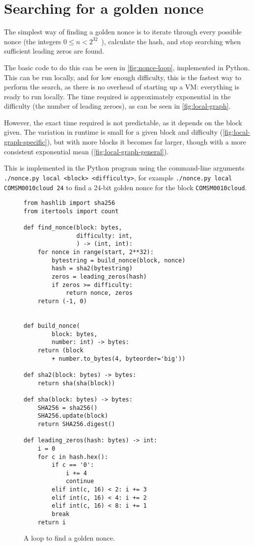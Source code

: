 \documentclass[letterpaper,twocolumn,11pt]{article}
\begin{document}
\section{Searching for a golden nonce}

The simplest way of finding a golden nonce is to iterate through every possible nonce (the integers $0\leq n< 2^{32}$~\cite{cw1}), calculate the hash, and stop searching when sufficient leading zeros are found.

The basic code to do this can be seen in \autoref{fig:nonce-loop}, implemented in Python. This can be run locally, and for low enough difficulty, this is the fastest way to perform the search, as there is no overhead of starting up a VM: everything is ready to run locally. The time required is approximately exponential in the difficulty (the number of leading zeroes), as can be seen in \autoref{fig:local-graph}.

However, the exact time required is not predictable, as it depends on the block given. The variation in runtime is small for a given block and difficulty (\autoref{fig:local-graph-specific}), but with more blocks it becomes far larger, though with a more consistent exponential mean (\autoref{fig:local-graph-general}).

This is implemented in the Python program using the command-line arguments \texttt{./nonce.py local <block> <difficulty>}, for example \verb|./nonce.py local COMSM0010cloud 24| to find a 24-bit golden nonce for the block \texttt{COMSM0010cloud}.

\begin{figure}
\begin{verbatim}
from hashlib import sha256
from itertools import count

def find_nonce(block: bytes,
               difficulty: int,
               ) -> (int, int):
    for nonce in range(start, 2**32):
        bytestring = build_nonce(block, nonce)
        hash = sha2(bytestring)
        zeros = leading_zeros(hash)
        if zeros >= difficulty:
            return nonce, zeros
    return (-1, 0)


def build_nonce(
        block: bytes,
        number: int) -> bytes:
    return (block
        + number.to_bytes(4, byteorder='big'))

def sha2(block: bytes) -> bytes:
    return sha(sha(block))

def sha(block: bytes) -> bytes:
    SHA256 = sha256()
    SHA256.update(block)
    return SHA256.digest()

def leading_zeros(hash: bytes) -> int:
    i = 0
    for c in hash.hex():
        if c == '0':
            i += 4
            continue
        elif int(c, 16) < 2: i += 3
        elif int(c, 16) < 4: i += 2
        elif int(c, 16) < 8: i += 1
        break
    return i
\end{verbatim}
\caption{A loop to find a golden nonce.}
\label{fig:nonce-loop}
\end{figure}
\end{document}
